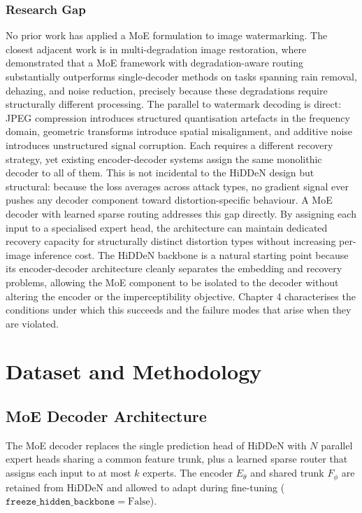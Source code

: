 ﻿\documentclass[12pt, a4paper, twoside]{report}
\numberwithin{equation}{chapter}
\begin{document}
\subsection*{Research Gap}

No prior work has applied a MoE formulation to image watermarking. The closest adjacent work is in multi-degradation image restoration, where \cite{li2022} demonstrated that a MoE framework with degradation-aware routing substantially outperforms single-decoder methods on tasks spanning rain removal, dehazing, and noise reduction, precisely because these degradations require structurally different processing. The parallel to watermark decoding is direct: JPEG compression introduces structured quantisation artefacts in the frequency domain, geometric transforms introduce spatial misalignment, and additive noise introduces unstructured signal corruption. Each requires a different recovery strategy, yet existing encoder-decoder systems assign the same monolithic decoder to all of them. This is not incidental to the HiDDeN design but structural: because the loss averages across attack types, no gradient signal ever pushes any decoder component toward distortion-specific behaviour.
A MoE decoder with learned sparse routing addresses this gap directly. By assigning each input to a specialised expert head, the architecture can maintain dedicated recovery capacity for structurally distinct distortion types without increasing per-image inference cost. The HiDDeN backbone \cite{zhu2018} is a natural starting point because its encoder-decoder architecture cleanly separates the embedding and recovery problems, allowing the MoE component to be isolated to the decoder without altering the encoder or the imperceptibility objective. Chapter 4 characterises the conditions under which this succeeds and the failure modes that arise when they are violated.

\chapter{Dataset and Methodology}

\section{MoE Decoder Architecture}
\label{sec:moe-arch}

The MoE decoder replaces the single prediction head of HiDDeN with $N$ parallel expert heads sharing a common feature trunk, plus a learned sparse router that assigns each input to at most $k$ experts. The encoder $E_\theta$ and shared trunk $F_\phi$ are retained from HiDDeN and allowed to adapt during fine-tuning ($\texttt{freeze\_hidden\_backbone}=\mathrm{False}$).
\end{document}
